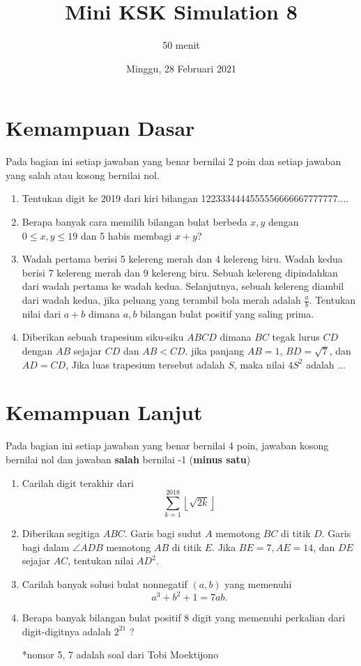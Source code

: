 \documentclass[12pt]{scrartcl}
\title{Mini KSK Simulation 8 }
\author{50 menit}
\date{Minggu, 28 Februari 2021}
\begin{document}
	\maketitle

\renewcommand*\contentsname{Daftar Isi}
\tableofcontents

\newpage
	
	\section{Kemampuan Dasar}
	Pada bagian ini setiap jawaban yang benar bernilai 2 poin dan setiap jawaban yang salah
	atau kosong bernilai nol.
	\begin{enumerate}
		\item
		Tentukan digit ke 2019 dari kiri bilangan 1223334444555556666667777777....
		
		\item
		Berapa banyak cara memilih bilangan bulat berbeda $x, y$ dengan $0 \le x, y \le 19$ dan 5 habis membagi $x + y$?
		
		\item
		Wadah pertama berisi 5 kelereng merah dan 4 kelereng biru. Wadah kedua berisi 7 kelereng merah dan
		9 kelereng biru. Sebuah kelereng dipindahkan dari wadah pertama ke wadah kedua. Selanjutnya, sebuah
		kelereng diambil dari wadah kedua, jika peluang yang terambil bola merah adalah
		$\frac{a}{b}$. Tentukan nilai dari $a+b$ dimana $a, b$ bilangan bulat positif yang saling prima.
		
		\item
		Diberikan sebuah trapesium siku-siku $ABCD$ dimana $BC$ tegak lurus $CD$ dengan $AB$ sejajar $CD$ dan $AB < CD$. jika panjang $AB = 1$, $BD = \sqrt{7}$, dan $AD = CD$, Jika luas trapesium tersebut adalah $S$, maka nilai $4S^2$ adalah ...
		
	\end{enumerate}
\section{Kemampuan Lanjut}
Pada bagian ini setiap jawaban yang benar bernilai 4 poin, jawaban kosong bernilai nol
dan jawaban \textbf{salah} bernilai -1 (\textbf{minus satu})

\begin{enumerate}[resume]
	\item
	Carilah digit terakhir dari $$\sum_{k=1}^{2018} \left \lfloor \sqrt{2k} \right \rfloor $$
	\item Diberikan segitiga $ABC$. Garis bagi sudut $A$ memotong $BC$ di titik $D$. Garis bagi
	dalam $\angle ADB$ memotong $AB$ di titik $E$. Jika $BE = 7, AE = 14$, dan $DE$ sejajar $AC$,
	tentukan nilai $AD^2$.
	\item
	Carilah banyak solusi bulat nonnegatif $(a,b)$ yang memenuhi $$a^3+b^2+1=7ab.$$
	
	\item
	Berapa banyak bilangan bulat positif 8 digit yang memenuhi perkalian dari digit-digitnya adalah $2^{21}$
	?
	
	*nomor 5, 7 adalah soal dari Tobi Moektijono
	
	
	
	
	
\end{enumerate}
\end{document}
